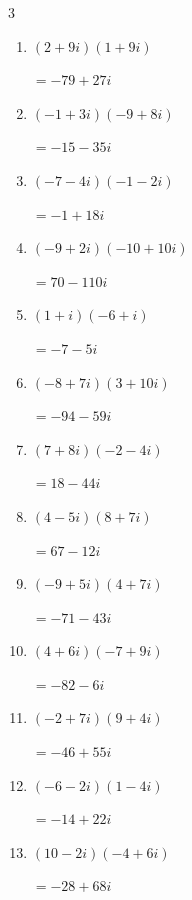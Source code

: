 \begin{multicols}{3}
\begin{enumerate}
        $\displaystyle =-41-23i$

  \item $\displaystyle (2+9i)(1+9i)$

        $\displaystyle =-79+27i$

  \item $\displaystyle (-1+3i)(-9+8i)$

        $\displaystyle =-15-35i$

  \item $\displaystyle (-7-4i)(-1-2i)$

        $\displaystyle =-1+18i$

  \item $\displaystyle (-9+2i)(-10+10i)$

        $\displaystyle =70-110i$

  \item $\displaystyle (1+i)(-6+i)$

        $\displaystyle =-7-5i$

  \item $\displaystyle (-8+7i)(3+10i)$

        $\displaystyle =-94-59i$

  \item $\displaystyle (7+8i)(-2-4i)$

        $\displaystyle =18-44i$

  \item $\displaystyle (4-5i)(8+7i)$

        $\displaystyle =67-12i$

  \item $\displaystyle (-9+5i)(4+7i)$

        $\displaystyle =-71-43i$

  \item $\displaystyle (4+6i)(-7+9i)$

        $\displaystyle =-82-6i$

  \item $\displaystyle (-2+7i)(9+4i)$

        $\displaystyle =-46+55i$

  \item $\displaystyle (-6-2i)(1-4i)$

        $\displaystyle =-14+22i$

\columnbreak %

  \item $\displaystyle (10-2i)(-4+6i)$

        $\displaystyle =-28+68i$


\end{enumerate}
\end{multicols}
